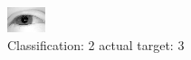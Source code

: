 \begin{figure}[h!]
\begin{center}
\includegraphics[width=0.60\columnwidth]{figures/ID2389_class_2_target_3.png}
\end{center}
\caption{ Classification: 2 actual target: 3}
\label{fig:ID2389_class_2_target_3}
\end{figure}

